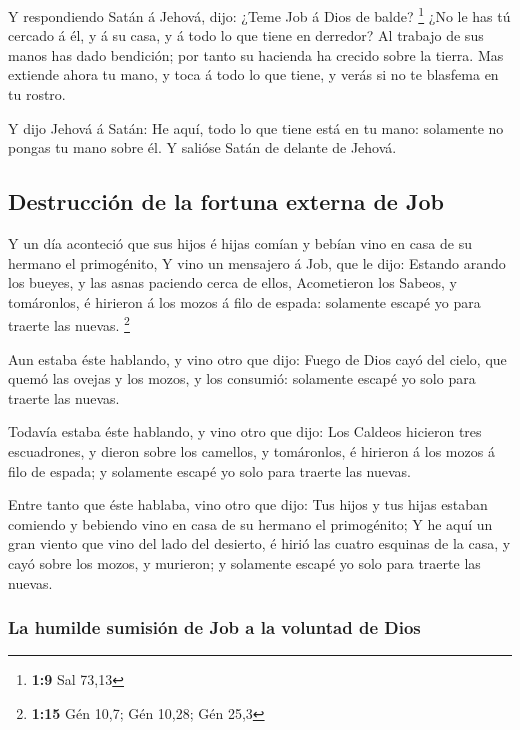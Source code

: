  Y respondiendo Satán á Jehová, dijo: ¿Teme Job á Dios de
balde? \footnote{\textbf{1:9} Sal 73,13}  ¿No le has tú
cercado á él, y á su casa, y á todo lo que tiene en derredor? Al trabajo
de sus manos has dado bendición; por tanto su hacienda ha crecido sobre
la tierra.  Mas extiende ahora tu mano, y toca á todo lo
que tiene, y verás si no te blasfema en tu rostro.

 Y dijo Jehová á Satán: He aquí, todo lo que tiene está
en tu mano: solamente no pongas tu mano sobre él. Y salióse Satán de
delante de Jehová.

\hypertarget{destrucciuxf3n-de-la-fortuna-externa-de-job}{%
\subsection{Destrucción de la fortuna externa de
Job}\label{destrucciuxf3n-de-la-fortuna-externa-de-job}}

 Y un día aconteció que sus hijos é hijas comían y bebían
vino en casa de su hermano el primogénito,  Y vino un
mensajero á Job, que le dijo: Estando arando los bueyes, y las asnas
paciendo cerca de ellos,  Acometieron los Sabeos, y
tomáronlos, é hirieron á los mozos á filo de espada: solamente escapé yo
para traerte las nuevas. \footnote{\textbf{1:15} Gén 10,7; Gén 10,28;
  Gén 25,3}

 Aun estaba éste hablando, y vino otro que dijo: Fuego de
Dios cayó del cielo, que quemó las ovejas y los mozos, y los consumió:
solamente escapé yo solo para traerte las nuevas.

 Todavía estaba éste hablando, y vino otro que dijo: Los
Caldeos hicieron tres escuadrones, y dieron sobre los camellos, y
tomáronlos, é hirieron á los mozos á filo de espada; y solamente escapé
yo solo para traerte las nuevas.

 Entre tanto que éste hablaba, vino otro que dijo: Tus
hijos y tus hijas estaban comiendo y bebiendo vino en casa de su hermano
el primogénito;  Y he aquí un gran viento que vino del
lado del desierto, é hirió las cuatro esquinas de la casa, y cayó sobre
los mozos, y murieron; y solamente escapé yo solo para traerte las
nuevas.

\hypertarget{la-humilde-sumisiuxf3n-de-job-a-la-voluntad-de-dios}{%
\subsubsection{La humilde sumisión de Job a la voluntad de
Dios}\label{la-humilde-sumisiuxf3n-de-job-a-la-voluntad-de-dios}}

